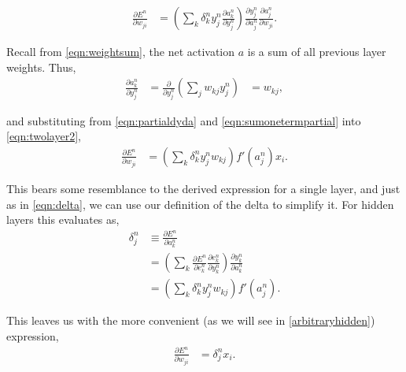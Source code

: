 \documentclass[thesis]{subfiles}
\begin{document}
\begin{equation}
\begin{aligned}
    \frac{\partial E^n}{\partial w_{ji}} &= \left( \sum_k \delta^n_k y^n_j \frac{\partial a^n_k}{\partial y^n_{j}}\right)
     \frac{\partial y^n_{j}}{\partial a^n_{j}} \frac{\partial a^n_{j}}{\partial w_{ji}}.
     \label{eqn:twolayer2}
\end{aligned}
\end{equation}

Recall from \cref{eqn:weightsum}, the net activation $a$ is a sum of all previous layer weights. Thus,
\begin{equation}
\begin{aligned}
    \frac{\partial a^n_k}{\partial y^n_{j}} &= \frac{\partial}{\partial y^n_{j}}\left(\sum_j w_{kj} y^n_{j} \right) &= w_{kj},
\end{aligned}
\end{equation}

and substituting from \cref{eqn:partialdyda} and \cref{eqn:sumonetermpartial} into \cref{eqn:twolayer2},
\begin{equation}
\begin{aligned}
    \frac{\partial E^n}{\partial w_{ji}} &= \left( \sum_k \delta^n_k y^n_j w_{kj}\right)
     f'\left( a^n_j \right) x_i.
     \label{eqn:twolayer3}
\end{aligned}
\end{equation}

This bears some resemblance to the derived expression for a single layer, and just as in \cref{eqn:delta}, we can use our definition of the delta to simplify it. For hidden layers this evaluates as,
\begin{equation}
\label{eqn:deltahidden}
\begin{aligned}
    \delta^n_j &\equiv \frac{\partial E^n}{\partial a^n_k}\\
    &= \left( \sum_k \frac{\partial E^n}{\partial e^n_{k}} \frac{\partial e^n_{k}}{\partial y^n_{k}} \right) \frac{\partial y^n_{k}}{\partial a^n_k}\\
    &= \left(\sum_k \delta^n_k y^n_j w_{kj} \right) f'\left( a^n_j \right).
\end{aligned}
\end{equation}

This leaves us with the more convenient (as we will see in \cref{arbitraryhidden}) expression,
\begin{equation}
\begin{aligned}
    \frac{\partial E^n}{\partial w_{ji}} &=  \delta^n_j x_i.
     \label{eqn:twolayer4}
\end{aligned}
\end{equation}
\end{document}
